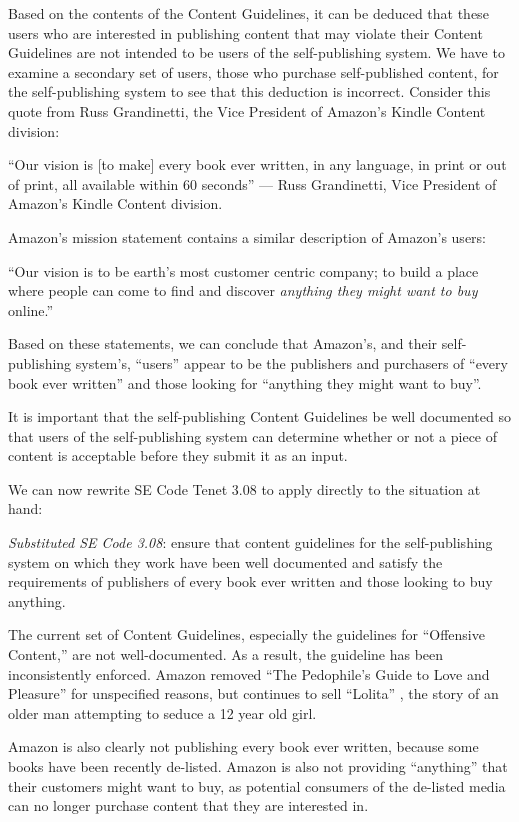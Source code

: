 \documentclass[11pt]{article}
\begin{document}
\begin{multicols}{2}
Based on the contents of the Content Guidelines, it can be deduced that these users who are interested in publishing content that may violate their Content Guidelines are not intended to be users of the self-publishing system.  We have to examine a secondary set of users, those who purchase self-published content, for the self-publishing system to see that this deduction is incorrect.  Consider this quote from Russ Grandinetti, the Vice President of Amazon's Kindle Content division:

``Our vision is [to make] every book ever written, in any language, in print or out of print, all available within 60 seconds'' --- Russ Grandinetti, Vice President of Amazon's Kindle Content division. \cite{LATimesRussQuote}

Amazon's mission statement contains a similar description of Amazon's users:

``Our vision is to be earth's most customer centric company; to build a place where people can come to find and discover \emph{anything they might want to buy} online.'' \cite[Emphasis Mine]{AmazonIRFAQ}

Based on these statements, we can conclude that Amazon's, and their self-publishing system's, ``users'' appear to be the publishers and purchasers of ``every book ever written'' and those looking for ``anything they might want to buy''.

It is important that the self-publishing Content Guidelines be well documented so that users of the self-publishing system can determine whether or not a piece of content is acceptable before they submit it as an input.

We can now rewrite SE Code Tenet 3.08 to apply directly to the situation at hand:

\emph{Substituted SE Code 3.08}: ensure that content guidelines for the self-publishing system on which they work have been well documented and satisfy the requirements of publishers of every book ever written and those looking to buy anything.

The current set of Content Guidelines, especially the guidelines for ``Offensive Content,'' are not well-documented.  As a result, the guideline has been inconsistently enforced.  Amazon removed ``The Pedophile's Guide to Love and Pleasure'' for unspecified reasons, but continues to sell ``Lolita'' \cite{AmazonLolitaDTPListing}, the story of an older man attempting to seduce a 12 year old girl. 

Amazon is also clearly not publishing every book ever written, because some books have been recently de-listed.  Amazon is also not providing ``anything'' that their customers might want to buy, as potential consumers of the de-listed media can no longer purchase content that they are interested in.


\end{multicols}
\end{document}
